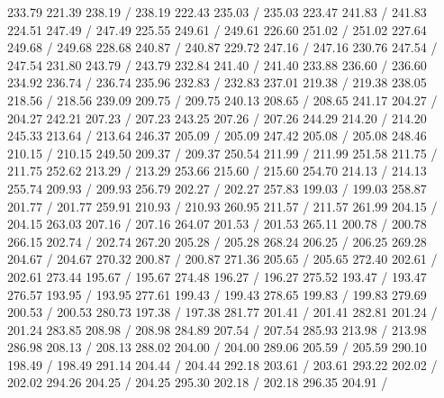 { 233.79 221.39 238.19 /
 238.19 222.43 235.03 /
 235.03 223.47 241.83 /
 241.83 224.51 247.49 /
 247.49 225.55 249.61 /
 249.61 226.60 251.02 /
 251.02 227.64 249.68 /
 249.68 228.68 240.87 /
 240.87 229.72 247.16 /
 247.16 230.76 247.54 /
 247.54 231.80 243.79 /
 243.79 232.84 241.40 /
 241.40 233.88 236.60 /
 236.60 234.92 236.74 /
 236.74 235.96 232.83 /
 232.83 237.01 219.38 /
 219.38 238.05 218.56 /
 218.56 239.09 209.75 /
 209.75 240.13 208.65 /
 208.65 241.17 204.27 /
 204.27 242.21 207.23 /
 207.23 243.25 207.26 /
 207.26 244.29 214.20 /
 214.20 245.33 213.64 /
 213.64 246.37 205.09 /
 205.09 247.42 205.08 /
 205.08 248.46 210.15 /
 210.15 249.50 209.37 /
 209.37 250.54 211.99 /
 211.99 251.58 211.75 /
 211.75 252.62 213.29 /
 213.29 253.66 215.60 /
 215.60 254.70 214.13 /
 214.13 255.74 209.93 /
 209.93 256.79 202.27 /
 202.27 257.83 199.03 /
 199.03 258.87 201.77 /
 201.77 259.91 210.93 /
 210.93 260.95 211.57 /
 211.57 261.99 204.15 /
 204.15 263.03 207.16 /
 207.16 264.07 201.53 /
 201.53 265.11 200.78 /
 200.78 266.15 202.74 /
 202.74 267.20 205.28 /
 205.28 268.24 206.25 /
 206.25 269.28 204.67 /
 204.67 270.32 200.87 /
 200.87 271.36 205.65 /
 205.65 272.40 202.61 /
 202.61 273.44 195.67 /
 195.67 274.48 196.27 /
 196.27 275.52 193.47 /
 193.47 276.57 193.95 /
 193.95 277.61 199.43 /
 199.43 278.65 199.83 /
 199.83 279.69 200.53 /
 200.53 280.73 197.38 /
 197.38 281.77 201.41 /
 201.41 282.81 201.24 /
 201.24 283.85 208.98 /
 208.98 284.89 207.54 /
 207.54 285.93 213.98 /
 213.98 286.98 208.13 /
 208.13 288.02 204.00 /
 204.00 289.06 205.59 /
 205.59 290.10 198.49 /
 198.49 291.14 204.44 /
 204.44 292.18 203.61 /
 203.61 293.22 202.02 /
 202.02 294.26 204.25 /
 204.25 295.30 202.18 /
 202.18 296.35 204.91 /
}
